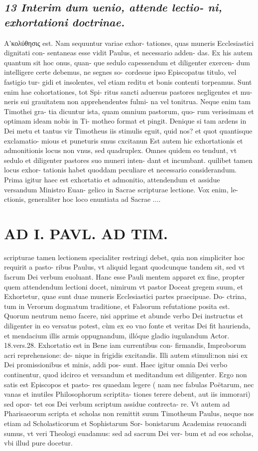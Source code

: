 \documentclass{article}
\begin{document}
\begin{pages}
\subsection*{\textit{13 Interim dum uenio, attende lectio- ni, exhortationi doctrinae. }}\pstart Α’κολύθησις est. Nam sequuntur variae exhor- tationes, quas muneris Ecclesiastici dignitati con- sentaneas esse vidit Paulus, et necessario adden- das. Ex his autem quantum sit hoc onus, quan- que sedulo capessendum et diligenter exercen- dum intelligere certe debemus, ne segnes so- cordesue ipso Episcopatus titulo, vel fastigio tur- gidi et insolentes, vel etiam reditu et bonis contenti torpeamus. Sunt enim hae cohortationes, tot Spi- ritus sancti aduersus pastores negligentes et mu- neris sui grauitatem non apprehendentes fulmi- na vel tonitrua. Neque enim tam Timothei gra- tia dicuntur ista, quam omnium pastorum, quo- rum verissimam et optimam ideam nobis in Ti- motheo format et pingit. Denique si tam ardens in Dei metu et tantus vir Timotheus iis stimulis eguit, quid nos? et quot quantisque exclamatio- mious et puneturis smus cxcitanun Est autem hic exhortationis et admonitionis locus non vnus, sed quadruplex. Omnes quidem eo tendunt, vt sedulo et diligenter pastores suo muneri inten- dant et incumbant. quilibet tamen locus exhor- tationis habet quoddam peculiare et necessario considerandum.  \pend\pstart Prima igitur haec est exhortatio et admonitio, attendendum et assidue versandum Ministro Euan- gelico in Sacrae scripturae lectione. Vox enim, le- ctionis, generaliter hoc loco enuntiata ad Sacrae ....  \pend
\section*{AD I. PAVL. AD TIM. }
\marginpar{[ p.432 ]}\pstart scripturae tamen lectionem specialiter restringi debet, quia non simpliciter hoc requirit a pasto- ribus Paulus, vt aliquid legant quodcunque  tandem sit, sed vt facrum Dei verbum euoluant. Hanc esse Pauli mentem apparet ex fine, propter quem attendendum lectioni docet, nimirum vt pastor Doceat gregem suum, et Exhortetur, quae sunt duae muneris Ecclesiastici partes praecipuae. Do- ctrina, tum in Verorum dogmatum traditione, et Falsorum refutatione posita est. Quorum neutrum nemo facere, nisi apprime et abunde verbo Dei instructus et diligenter in eo versatus potest, cùm ex eo vno fonte et veritas Dei fit haurienda, et mendacium illis armis oppugnandum, illóque gladio iugulandum Actor. 18.vers.28.  \pend\pstart Exhortatio est in Bene iam currentibus con- firmandis, Improborum acri reprehensione: de- nique in frigidis excitandis. Illi autem stimuli:non nisi ex Dei promissionibus et minis, addi pos- sunt. Haec igitur omnia Dei verbo continentur, quod idcirco et versandum et meditandum est diligenter. Ergo non satis est Episcopos et pasto- res quaedam legere ( nam nec fabulas Poëtarum, nec vanas et inutiles Philosophorum scriptita- tiones terere debent, aut iis immorari) sed opor- tet eos Dei verbum scriptum assidue contrecta- re. Vt autem ad Pharisaeorum scripta et scholas non remittit suum Timotheum Paulus, neque nos etiam ad Scholasticorum et Sophistarum Sor- bonistarum Academias reuocandi sumus, vt veri Theologi euadamus: sed ad sacrum Dei ver- bum et ad eos scholas, vbi illud pure docetur.  \pend

\end{pages}
\end{document}
